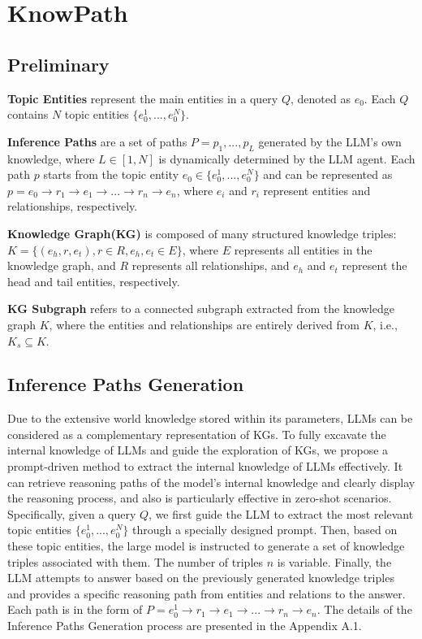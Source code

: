 \section{KnowPath}
\subsection{Preliminary}
\textbf{Topic Entities} represent the main entities in a query $Q$, denoted as $e_0$. 
Each $Q$ contains $N$ topic entities $\{e_0^1, ...,  e_0^N\}$.


 
\noindent\textbf{Inference Paths} are a set of paths $P = {p_1, ..., p_L}$ generated by the LLM's own knowledge, where $L \in [1, N]$ is dynamically determined by the LLM agent. Each path $p$ starts from the topic entity $e_0 \in \{e_0^1,..., e_0^N\}$ and can be represented as $p = e_0 \to r_1 \to e_1 \to ... \to r_n \to e_n$, where $e_i$ and $r_i$ represent entities and relationships, respectively.


\noindent\textbf{Knowledge Graph(KG)} is composed of many structured knowledge triples: $K=\{(e_h,r,e_t),r\in R,e_h,e_t\in E\}$, where $E$ represents all entities in the knowledge graph, and $R$ represents all relationships, and 
$e_h$ and $e_t$ represent the head and tail entities, respectively.

\noindent\textbf{KG Subgraph} refers to a connected subgraph extracted from the knowledge graph $K$, where the entities and relationships are entirely derived from $K$, i.e., $K_s\subseteq K$.

\subsection{Inference Paths Generation}
\label{sec:ipg}

Due to the extensive world knowledge stored within its parameters, LLMs can be considered as a complementary representation of KGs.
To fully excavate the internal knowledge of LLMs and guide the exploration of KGs, we propose a prompt-driven method to extract the internal knowledge of LLMs effectively.
It can retrieve reasoning paths of the model's internal knowledge and clearly display the reasoning process, and also is particularly effective in zero-shot scenarios.
Specifically, given a query $Q$, we first guide the LLM to extract the most relevant topic entities $\{e_0^1, ..., e_0^N\}$ through a specially designed prompt.
Then, based on these topic entities, the large model is instructed to generate a set of knowledge triples associated with them. The number of triples $n$ is variable.
Finally, the LLM attempts to answer based on the previously generated knowledge triples and provides a specific reasoning path from entities and relations to the answer. Each path is in the form of $P=e_0^1 \to r_1 \to e_1 \to ... \to r_n \to e_n$. The details of the Inference Paths Generation process are presented in the Appendix A.1.


